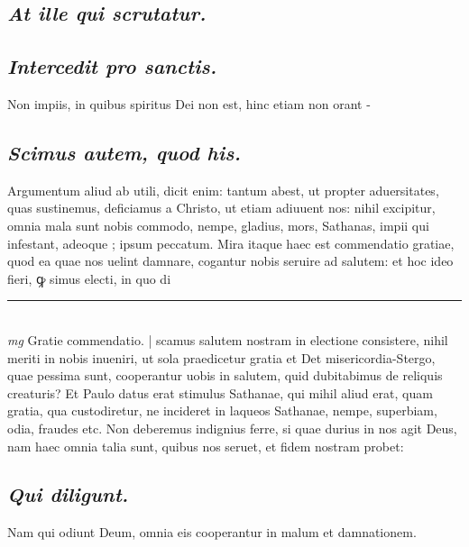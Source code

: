\documentclass{article}
\begin{document}
\begin{pages}
\subsection*{\textit{At ille qui scrutatur. }}
{}
\subsection*{\textit{Intercedit pro sanctis. }}\pstart Non impiis, in quibus spiritus Dei non est, hinc etiam non orant -  \pend
{}
{}
\subsection*{\textit{Scimus autem, quod his. }}\pstart Argumentum aliud ab utili, dicit enim: tantum abest, ut propter aduersitates, quas sustinemus, deficiamus a Christo, ut etiam adiuuent nos: nihil excipitur, omnia mala sunt nobis commodo, nempe, gladius, mors, Sathanas, impii qui infestant, adeoque ; ipsum peccatum. Mira itaque haec est commendatio gratiae, quod ea quae nos uelint damnare, cogantur nobis seruire ad salutem: et hoc ideo fieri, ꝙ simus electi, in quo di\pend
\vspace{0.5cm}\noindent
\vspace{0.2cm}\rule{1cm}{0.2pt}\\ 
\hspace{0.2cm}\textit{mg}
\footnotesize Gratie commendatio. 
\normalsize| 
\marginpar{[ p.N 4 ]}
\marginpar{[ p.]}\pstart scamus salutem nostram in electione consistere, nihil meriti in nobis inueniri, ut sola praedicetur gratia et Det misericordia-Stergo, quae pessima sunt, cooperantur uobis in salutem, quid dubitabimus de reliquis creaturis? Et Paulo datus erat stimulus Sathanae, qui mihil aliud erat, quam gratia, qua custodiretur, ne incideret in laqueos Sathanae, nempe, superbiam, odia, fraudes etc. Non deberemus indignius ferre, si quae durius in nos agit Deus, nam haec omnia talia sunt, quibus nos seruet, et fidem nostram probet:  \pend
{}
{}
\subsection*{\textit{Qui diligunt. }}\pstart Nam qui odiunt Deum, omnia eis cooperantur in malum et damnationem.  \pend
{}
{}

\end{pages}
\end{document}
